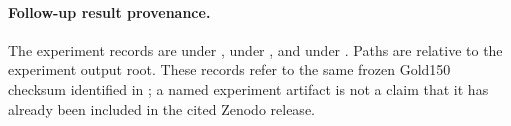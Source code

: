 \FloatBarrier
\paragraph{Follow-up result provenance.}
\begin{sloppypar}
The experiment records are  under ,  under , and  under . Paths are relative to the experiment output root. These records refer to the same frozen Gold150 checksum identified in ; a named experiment artifact is not a claim that it has already been included in the cited Zenodo release.
\end{sloppypar}
